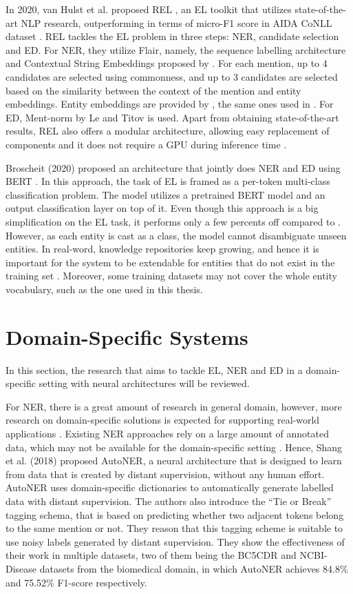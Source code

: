\documentclass{report}
\theoremstyle{definition}
\theoremstyle{remark}
\begin{document}
In 2020, van Hulst et al. proposed REL \cite{REL}, an EL toolkit that utilizes state-of-the-art NLP research, outperforming \cite{kolitsas} in terms of micro-F1 score in AIDA CoNLL dataset \cite{CoNLLYago}. REL tackles the EL problem in three steps: NER, candidate selection and ED. For NER, they utilize Flair, namely, the sequence labelling architecture and Contextual String Embeddings proposed by \cite{flairpaper}. For each mention, up to 4 candidates are selected using commonness, and up to 3 candidates are selected based on the similarity between the context of the mention and entity embeddings. Entity embeddings are provided by \cite{kolitsasEmbed}, the same ones used in \cite{kolitsas}. For ED, Ment-norm by Le and Titov \cite{mentnorm} is used. Apart from obtaining state-of-the-art results, REL also offers a modular architecture, allowing easy replacement of components and it does not require a GPU during inference time \cite{REL}. 

Broscheit (2020) \cite{bertEL} proposed an architecture that jointly does NER and ED using BERT \cite{BERT}. In this approach, the task of EL is framed as a per-token multi-class classification problem. The model utilizes a pretrained BERT model and an output classification layer on top of it. Even though this approach is a big simplification on the EL task, it performs only a few percents off compared to \cite{kolitsas}.  However, as each entity is cast as a class, the model cannot disambiguate unseen entities. In real-word, knowledge repositories keep growing, and hence it is important for the system to be extendable for entities that do not exist in the training set \cite{gupta}. Moreover, some training datasets may not cover the whole entity vocabulary, such as the one used in this thesis.

\section{Domain-Specific Systems}
\label{domSpec}
In this section, the research that aims to tackle EL, NER and ED in a domain-specific setting with neural architectures will be reviewed.

For NER, there is a great amount of research in general domain, however, more research on domain-specific solutions is expected for supporting real-world applications \cite{quote1}. Existing NER approaches rely on a large amount of annotated data, which may not be available for the domain-specific setting \cite{NERDict2}. Hence, Shang et al. (2018) \cite{NERDict2} proposed AutoNER, a neural architecture that is designed to learn from data that is created by distant supervision, without any human effort. AutoNER uses domain-specific dictionaries to automatically generate labelled data with distant supervision. The authors also introduce the ``Tie or Break'' tagging schema, that is based on predicting whether two adjacent tokens belong to the same mention or not. They reason that this tagging scheme is suitable to use noisy labels generated by distant supervision. They show the effectiveness of their work in multiple datasets, two of them being the BC5CDR \cite{bc5cdr} and NCBI-Disease \cite{ncbi} datasets from the biomedical domain, in which AutoNER achieves 84.8\% and 75.52\% F1-score respectively.
\end{document}
